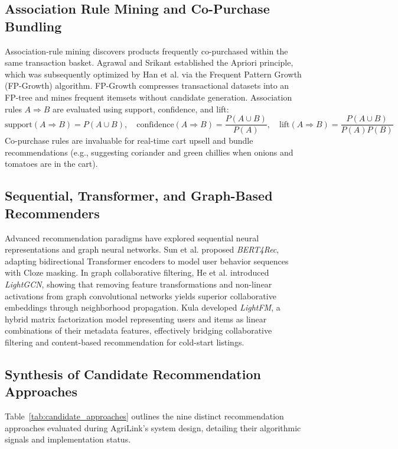 \subsection{Association Rule Mining and Co-Purchase Bundling}
Association-rule mining discovers products frequently co-purchased within the same transaction basket. Agrawal and Srikant \cite{Agrawal1994} established the Apriori principle, which was subsequently optimized by Han et al. \cite{Han2000} via the Frequent Pattern Growth (FP-Growth) algorithm. FP-Growth compresses transactional datasets into an FP-tree and mines frequent itemsets without candidate generation. Association rules $A \Rightarrow B$ are evaluated using support, confidence, and lift:
\begin{equation}
\text{support}(A \Rightarrow B) = P(A \cup B), \quad \text{confidence}(A \Rightarrow B) = \frac{P(A \cup B)}{P(A)}, \quad \text{lift}(A \Rightarrow B) = \frac{P(A \cup B)}{P(A)P(B)}
\end{equation}
Co-purchase rules are invaluable for real-time cart upsell and bundle recommendations (e.g., suggesting coriander and green chillies when onions and tomatoes are in the cart).

\subsection{Sequential, Transformer, and Graph-Based Recommenders}
Advanced recommendation paradigms have explored sequential neural representations and graph neural networks. Sun et al. \cite{Sun2019} proposed \textit{BERT4Rec}, adapting bidirectional Transformer encoders to model user behavior sequences with Cloze masking. In graph collaborative filtering, He et al. \cite{He2020} introduced \textit{LightGCN}, showing that removing feature transformations and non-linear activations from graph convolutional networks yields superior collaborative embeddings through neighborhood propagation. Kula \cite{Kula2015} developed \textit{LightFM}, a hybrid matrix factorization model representing users and items as linear combinations of their metadata features, effectively bridging collaborative filtering and content-based recommendation for cold-start listings.

\subsection{Synthesis of Candidate Recommendation Approaches}
Table~\ref{tab:candidate_approaches} outlines the nine distinct recommendation approaches evaluated during AgriLink's system design, detailing their algorithmic signals and implementation status.

